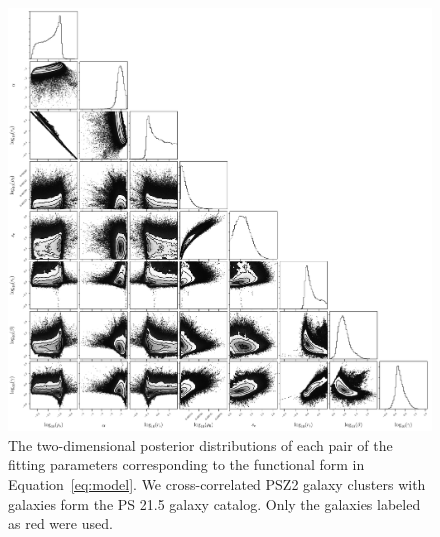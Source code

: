 \documentclass[iop, apjl, twocolappendix, numberedappendix]{emulateapj}
\begin{document}
\begin{figure}
    \includegraphics[width= \textwidth]{cornerred.pdf}
\caption{The two-dimensional posterior distributions of each pair of
the fitting parameters corresponding to the functional
form in Equation~\ref{eq:model}. We cross-correlated PSZ2 galaxy clusters with
galaxies form the PS 21.5 galaxy catalog. Only the galaxies labeled
as red were used.}
   \label{fig:cornerred} 
\end{figure}
\end{document}
